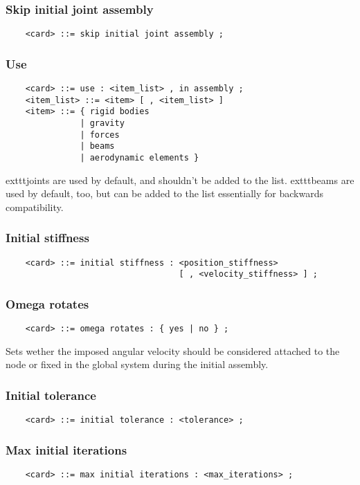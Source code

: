 \subsubsection{Skip initial joint assembly}
\begin{verbatim}
    <card> ::= skip initial joint assembly ;
\end{verbatim}

\subsubsection{Use}
\begin{verbatim}
    <card> ::= use : <item_list> , in assembly ;
    <item_list> ::= <item> [ , <item_list> ]
    <item> ::= { rigid bodies 
               | gravity
               | forces
               | beams
               | aerodynamic elements } 
\end{verbatim}
	exttt{joints} are used by default, and shouldn't be added to the list.
	exttt{beams} are used by default, too, but can be added to the list
essentially for backwards compatibility.

\subsubsection{Initial stiffness}
\begin{verbatim}
    <card> ::= initial stiffness : <position_stiffness>
                                   [ , <velocity_stiffness> ] ;
\end{verbatim}

\subsubsection{Omega rotates}
\begin{verbatim}
    <card> ::= omega rotates : { yes | no } ;
\end{verbatim}
Sets wether the imposed angular velocity should be considered attached 
to the node or fixed in the global system during the initial assembly.

\subsubsection{Initial tolerance}
\begin{verbatim}
    <card> ::= initial tolerance : <tolerance> ;
\end{verbatim}

\subsubsection{Max initial iterations}
\begin{verbatim}
    <card> ::= max initial iterations : <max_iterations> ;
\end{verbatim}

